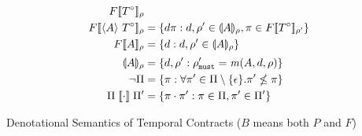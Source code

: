 {\begin{align*}
{        \denotetconfulle{\motcon}{\menv}}
      \\
     \denotetconfulle{\stbind{\mevent}{\motcon}}{\menv} &=
     \setbuild{\mdata \mtrace}{\mdata,\menv' \in \denoteevent{\mevent}{\menv}, \mtrace \in \denotetconfulle{\motcon}{\menv'}}
     \\
      \denotetconfulle{\mevent}{\menv} &= \setbuild{\mdata}{\mdata,\menv' \in \denoteevent{\mevent}{\menv}}
      \\[2pt]
      \denoteevent{\mevent}{\menv} &= \setbuild{\mdata,\menv'}{\menv'_\must = \matches(\mevent, \mdata, \menv)}
      \\
      \semneg{\Pi} &= \setbuild{\mtrace}{\forall \mtrace' \in
        \Pi\setminus\setof{\epsilon}. \mtrace' \nleq \mtrace}
      \\
      \Pi \semseq \Pi' &= \setbuild{\mtrace \cdot \mtrace'}{\mtrace
        \in \Pi, \mtrace' \in \Pi'}
    \end{align*}}{\caption{Denotational Semantics of Temporal Contracts ($B$ means both $P$ and $F$)}\label{fig:tcontract-denotation}}
